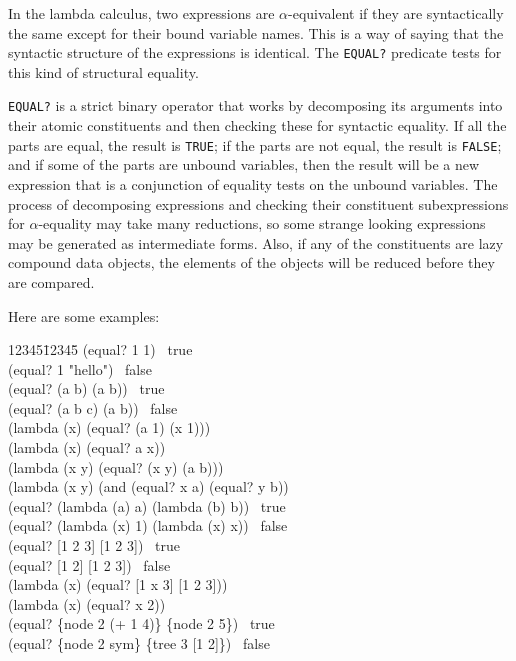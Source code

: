 	In the lambda calculus, two expressions are $\alpha$-equivalent if
they are syntactically the same except for their bound variable names. 
This is a way of saying that the syntactic structure of the expressions is
identical.  The {\tt EQUAL?} predicate tests for this kind of
structural equality.

	{\tt EQUAL?} is a strict binary operator that works by decomposing
its arguments into their atomic constituents and then checking these
for syntactic
equality. If all the parts are equal, the result is {\tt TRUE};  if the
parts are not equal, the result is {\tt FALSE}; and if some of the parts
are unbound variables, then the result will be a new expression that is
a conjunction of equality tests on the unbound variables.  The process
of decomposing expressions and checking their constituent 
subexpressions for $\alpha$-equality may take many reductions, so some
strange looking expressions may be generated as intermediate forms. 
Also, if any of the constituents are lazy compound data objects, the
elements of the objects will be reduced before they are compared.

	Here are some examples:
\begin{tt}\begin{tabbing}
12345\=12345\=\kill
\>	(equal? 1 1) \red\  true\\
\>	(equal? 1 "hello") \red\  false\\
\>	(equal? (a b) (a b)) \red\ true\\
\>	(equal? (a b c) (a b)) \red\ false\\
\>	(lambda (x) (equal? (a 1) (x 1))) \red\\
\>\>		 (lambda (x) (equal? a x))\\
\>	(lambda (x y) (equal? (x y) (a b))) \red\\
\>\>	 (lambda (x y) (and (equal? x a) (equal? y b))\\
\>	(equal? (lambda (a) a) (lambda (b) b)) \red\ true\\
\>	(equal? (lambda (x) 1) (lambda (x) x)) \red\ false\\
\>	(equal? [1 2 3] [1 2 3]) \red\ true\\
\>	(equal? [1 2] [1 2 3]) \red\ false\\
\>	(lambda (x) (equal? [1 x 3] [1 2 3])) \red\\
\>\>	 (lambda (x) (equal? x 2))\\
\>	(equal? \{node 2 (+ 1 4)\} \{node 2 5\}) \red\ true\\
\>	(equal? \{node 2 sym\} \{tree 3 [1 2]\}) \red\ false
\end{tabbing}\end{tt}

	

